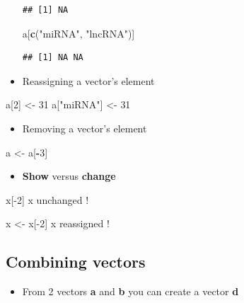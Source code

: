 \documentclass[]{book}
\newenvironment{Shaded}{\begin{snugshade}}{\end{snugshade}}
\newcommand{\DecValTok}[1]{\textcolor[rgb]{0.00,0.00,0.81}{#1}}
\newcommand{\KeywordTok}[1]{\textcolor[rgb]{0.13,0.29,0.53}{\textbf{#1}}}
\newcommand{\NormalTok}[1]{#1}
\newcommand{\OperatorTok}[1]{\textcolor[rgb]{0.81,0.36,0.00}{\textbf{#1}}}
\newcommand{\StringTok}[1]{\textcolor[rgb]{0.31,0.60,0.02}{#1}}
\providecommand{\tightlist}{%
  \setlength{\itemsep}{0pt}\setlength{\parskip}{0pt}}
\begin{document}
\begin{itemize}
\begin{verbatim}
## [1] NA
\end{verbatim}

\begin{Shaded}
\begin{Highlighting}[]
\NormalTok{a[}\KeywordTok{c}\NormalTok{(}\StringTok{"miRNA"}\NormalTok{, }\StringTok{"lncRNA"}\NormalTok{)]            }
\end{Highlighting}
\end{Shaded}

\begin{verbatim}
## [1] NA NA
\end{verbatim}
\item
  Reassigning a vector's element
\end{itemize}

\begin{Shaded}
\begin{Highlighting}[]
\NormalTok{a[}\DecValTok{2}\NormalTok{] <-}\StringTok{ }\DecValTok{31}
\NormalTok{a[}\StringTok{"miRNA"}\NormalTok{] <-}\StringTok{ }\DecValTok{31}
\end{Highlighting}
\end{Shaded}

\begin{itemize}
\tightlist
\item
  Removing a vector's element
\end{itemize}

\begin{Shaded}
\begin{Highlighting}[]
\NormalTok{a <-}\StringTok{ }\NormalTok{a[}\OperatorTok{-}\DecValTok{3}\NormalTok{]}
\end{Highlighting}
\end{Shaded}

\begin{itemize}
\tightlist
\item
  \textbf{Show} versus \textbf{change}
\end{itemize}

x{[}-2{]} x {unchanged} !

x \textless{}- x{[}-2{]} x {reassigned} !

\hypertarget{combining-vectors}{%
\subsection{Combining vectors}\label{combining-vectors}}

\begin{itemize}
\tightlist
\item
  From 2 vectors \textbf{a} and \textbf{b} you can create a vector \textbf{d}
\end{itemize}
\end{document}
